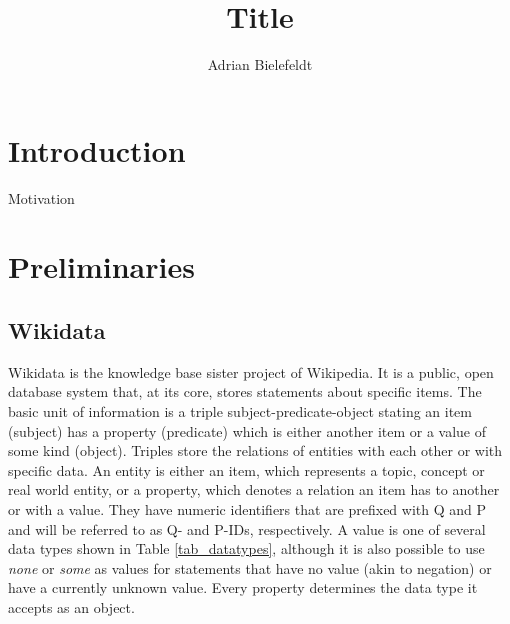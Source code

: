 \documentclass[hyperref,bachelorofscience,fleqn]{cgvpub}
\author{Adrian Bielefeldt}
\title{Title}
\begin{document}
\chapter{Introduction}
Motivation

\chapter{Preliminaries}

\section{Wikidata}
Wikidata is the knowledge base sister project of Wikipedia. It is a public, open database system that, at its core, stores statements about specific items. The basic unit of information is a triple subject-predicate-object stating an item (subject) has a property (predicate) which is either another item or a value of some kind (object). Triples store the relations of entities with each other or with specific data. An entity is either an item, which represents a topic, concept or real world entity, or a property, which denotes a relation an item has to another or with a value. They have numeric identifiers that are prefixed with Q and P and will be referred to as Q- and P-IDs, respectively. A value is one of several data types shown in Table \ref{tab_datatypes}, although it is also possible to use \emph{none} or \emph{some} as values for statements that have no value (akin to negation) or have a currently unknown value. Every property determines the data type it accepts as an object. \\
\end{document}
